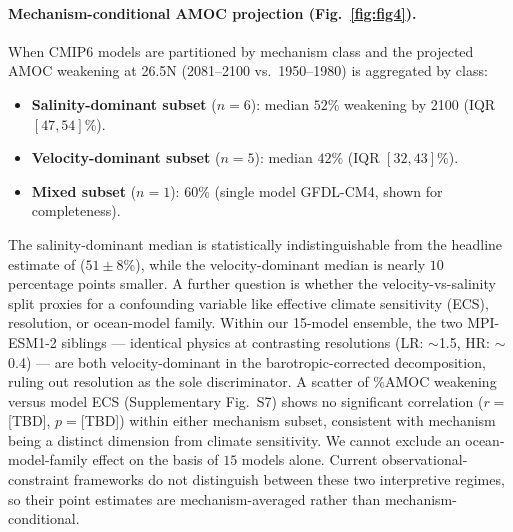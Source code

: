 \documentclass[12pt,a4paper]{article}
\begin{document}
\paragraph{Mechanism-conditional AMOC projection
(Fig.~\ref{fig:fig4}).}
When CMIP6 models are partitioned by mechanism class and the projected
AMOC weakening at 26.5\textdegree N (2081--2100 vs.\ 1950--1980) is
aggregated by class:
\begin{itemize}
\item \textbf{Salinity-dominant subset} ($n=6$): median $52\%$
      weakening by 2100 (IQR $[47, 54]$\%).
\item \textbf{Velocity-dominant subset} ($n=5$): median $42\%$ (IQR
      $[32, 43]$\%).
\item \textbf{Mixed subset} ($n=1$): $60\%$ (single model
      GFDL-CM4, shown for completeness).
\end{itemize}
The salinity-dominant median is statistically indistinguishable from
the headline estimate of \citet{Portmann2026} ($51\pm 8\%$), while
the velocity-dominant median is nearly $10$ percentage points
smaller. A further question is whether the velocity-vs-salinity
split proxies for a confounding variable like effective climate
sensitivity (ECS), resolution, or ocean-model family. Within our
15-model ensemble, the two MPI-ESM1-2 siblings --- identical physics
at contrasting resolutions (LR: $\sim$1.5\textdegree, HR:
$\sim$0.4\textdegree) --- are both velocity-dominant in the
barotropic-corrected decomposition, ruling out resolution as the
sole discriminator. A scatter of $\%$AMOC weakening versus model
ECS (Supplementary Fig.~S7) shows no significant correlation
($r=$[TBD], $p=$[TBD]) within either mechanism subset, consistent
with mechanism being a distinct dimension from climate sensitivity.
We cannot exclude an ocean-model-family effect on the basis of $15$
models alone.
Current observational-constraint frameworks
\citep{Portmann2026, Dong2024} do not distinguish between these two
interpretive regimes, so their point estimates are mechanism-averaged
rather than mechanism-conditional.
\end{document}
